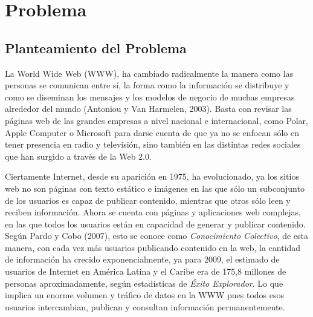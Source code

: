 \chapter{Problema}
\label{chap:problema}


\section{Planteamiento del Problema }

La World Wide Web (WWW), ha cambiado radicalmente la manera como las personas se comunican entre sí, la forma como la información se distribuye y como se diseminan los mensajes y los modelos de negocio de muchas empresas alrededor del mundo (Antoniou y Van Harmelen, 2003). Basta con revisar las páginas web de las grandes empresas a nivel nacional e internacional, como Polar, Apple Computer o Microsoft para darse cuenta de que ya no se enfocan sólo en tener presencia en radio y televisión, sino también en las distintas redes sociales que han surgido a través de la Web 2.0.

Ciertamente Internet, desde su aparición en 1975, ha evolucionado, ya los sitios web no son páginas con texto estático e imágenes en las que sólo un subconjunto de los usuarios es capaz de publicar contenido, mientras que otros sólo leen y reciben información. Ahora se cuenta con páginas y aplicaciones web complejas, en las que todos los usuarios están en capacidad de generar y publicar contenido. Según Pardo y Cobo (2007), esto se conoce como \textit{Conocimiento Colectivo}, de esta manera, con cada vez más usuarios publicando contenido en la web, la cantidad de información ha crecido exponencialmente, ya para 2009, el estimado de usuarios de Internet en América Latina y el Caribe era de 175,8 millones de personas aproximadamente, según estadísticas de \textit{Éxito Explorador}. Lo que implica un enorme volumen y tráfico de datos en la WWW pues todos esos usuarios intercambian, publican y consultan información permanentemente.

